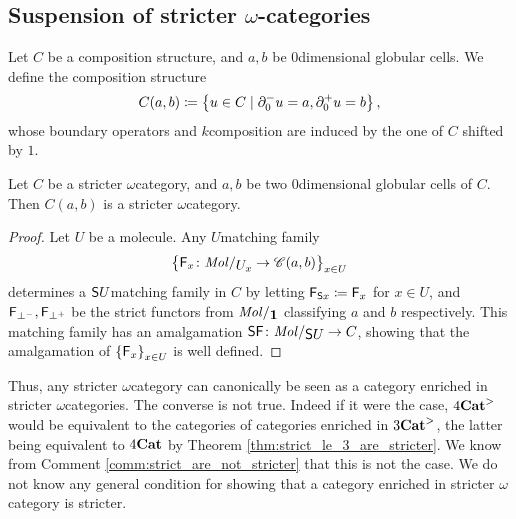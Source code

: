 \subsection{Suspension of stricter \texorpdfstring{$\omega$}{ω}-categories}

\begin{dfn} 
    Let \( C \) be a composition structure, and \( a, b \) be \( 0 \)\nbd dimensional globular cells.
    We define the composition structure
    \begin{equation*}
        C(a, b) \coloneqq \left\{ {u \in C \mid \partial_{0}^{-} u = a, \partial_{0}^{+} u = b} \right\},    
    \end{equation*}
    whose boundary operators and \( k \)\nbd composition are induced by the one of \( C \) shifted by \( 1 \).
\end{dfn}

\begin{lem} \label{lem:hom_of_stricter_is_stricter}
    Let \( C \) be a stricter \( \omega \)\nbd category, and \( a, b \) be two \( 0 \)\nbd dimensional globular cells of \( C \).
    Then \( C(a, b) \) is a stricter \( \omega \)\nbd category.
\end{lem}
\begin{proof}
    Let \( U \) be a molecule.
    Any \( U \)\nbd matching family 
    \begin{equation*}
        \set{\F_x \colon \molecin{\imel{U}{x}} \to \C(a, b)}_{x \in U}
    \end{equation*}
    determines a \( \mathsf{S}{U} \)\nbd matching family in \( C \) by letting \( \mathsf{F}_{\mathsf{S}{x}} \coloneqq \mathsf{F}_x \) for \( x \in U \), and \( \mathsf{F}_{\bot^-}, \mathsf{F}_{\bot^+} \) be the strict functors from \( \molecin{\pt} \) classifying \( a \) and \( b \) respectively. 
    This matching family has an amalgamation \( \sus{\F} \colon \molecin{\sus{U}} \to C \), showing that the amalgamation of \( \left\{ {\mathsf{F}_x} \right\}_{x \in U} \) is well defined.
\end{proof}

\begin{comm}
    Thus, any stricter \( \omega \)\nbd category can canonically be seen as a category enriched in stricter \( \omega \)\nbd categories.
    The converse is not true. 
    Indeed if it were the case, \( {4\mathbf{Cat}}^> \) would be equivalent to the categories of categories enriched in \( {3\mathbf{Cat}}^> \), the latter being equivalent to \( {4\mathbf{Cat}} \) by Theorem \ref{thm:strict_le_3_are_stricter}.
    We know from Comment \ref{comm:strict_are_not_stricter} that this is not the case.
    We do not know any general condition for showing that a category enriched in stricter \( \omega \)\nbd category is stricter.
\end{comm}

